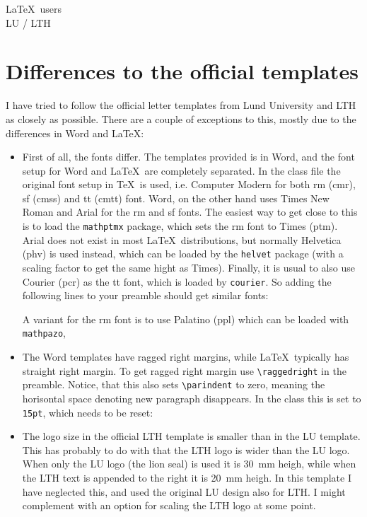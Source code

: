 \documentclass[11pt,eng,LTH,logoBW]{ulundletter}
\begin{document}
\begin{letter}{\LaTeX\ users\\ LU / LTH}
  \section{Differences to the official templates}
  I have tried to follow the official letter templates from Lund University and LTH as closely as possible. There are a couple of exceptions to this, mostly due to the differences in Word and \LaTeX:
  \begin{itemize}
  \item First of all, the fonts differ. The templates provided is in Word, and the font setup for Word and \LaTeX\ are completely separated. In the class file the original font setup in \TeX\ is used, i.e. Computer Modern for both rm (cmr), sf (cmss) and tt (cmtt) font. Word, on the other hand uses Times New Roman and Arial for the rm and sf fonts. The easiest way to get close to this is to load the \texttt{mathptmx} package, which sets the rm font to Times (ptm). Arial does not exist in most \LaTeX\ distributions, but normally Helvetica (phv) is used instead, which can be loaded by the \texttt{helvet} package (with a scaling factor to get the same hight as Times). Finally, it is usual to also use Courier (pcr) as the tt font, which is loaded by \texttt{courier}. So adding the following lines to your preamble should get similar fonts:
    \begin{CodeBox}{}
\usepackage{mathptmx}
\usepackage[scaled=.93]{helvet}
\usepackage{courier}
    \end{CodeBox}
    A variant for the rm font is to use Palatino (ppl) which can be loaded with \texttt{mathpazo}, 
    \begin{CodeBox}{}
\usepackage{mathpazo}
\usepackage[scaled=.93]{helvet}
\usepackage{courier}
    \end{CodeBox}
  \item The Word templates have ragged right margins, while \LaTeX\ typically has straight right margin. To get ragged right margin use \verb|\raggedright| in the preamble. Notice, that this also sets \verb|\parindent| to zero, meaning the horisontal space denoting new paragraph disappears. In the class this is set to \texttt{15pt}, which needs to be reset:
    \begin{CodeBox}{}
\raggedright
\parindent=15pt
    \end{CodeBox}
  \item The logo size in the official LTH template is smaller than in the LU template. This has probably to do with that the LTH logo is wider than the LU logo. When only the LU logo (the lion seal) is used it is 30~mm heigh, while when the LTH text is appended to the right it is 20~mm heigh. In this template I have neglected this, and used the original LU design also for LTH. I might complement with an option for scaling the LTH logo at some point.
  \end{itemize}

\end{letter}
\end{document}
